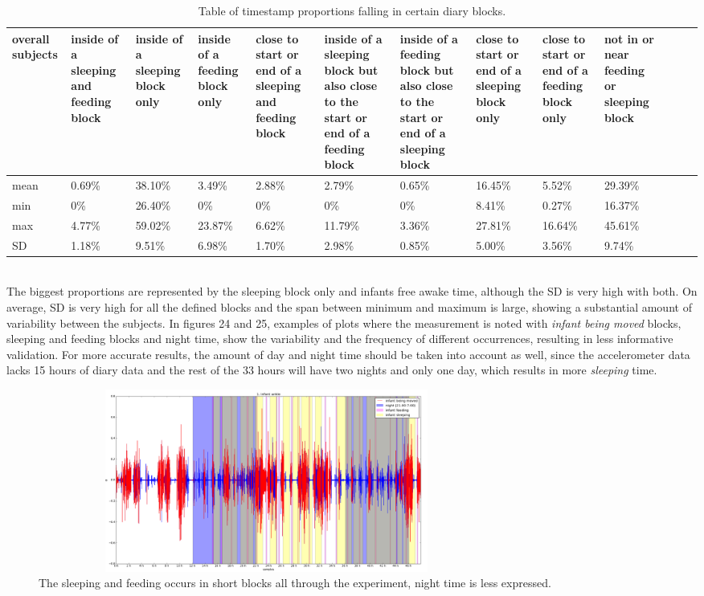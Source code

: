 \documentclass{article}
\begin{document}
{\begin{table}[h]\tiny
\centering
\begin{tabular}{|p{0.5cm}|p{1cm}|p{1cm}|p{1cm}|p{1.5cm}|p{1.5cm}|p{1.5cm}|p{1.2cm}|p{1cm}|p{1cm}|p{1cm}|p{1cm}|p{1cm}|}
\hline
overall subjects & inside of a sleeping and feeding block & inside of a sleeping block only & inside of a feeding block only & close to start or end of a sleeping and feeding block & inside of a sleeping block but also close to the start or end of a feeding block & inside of a feeding block but also close to the start or end of a sleeping block & close to start or end of a sleeping block only & close to start or end of a feeding block only & not in or near feeding or sleeping block \\ \hline
mean & 0.69\% & 38.10\% & 3.49\% & 2.88\% & 2.79\% & 0.65\% & 16.45\% & 5.52\% & 29.39\% \\ \hline
min & 0\% & 26.40\% & 0\% & 0\% & 0\% & 0\% & 8.41\% & 0.27\% & 16.37\% \\ \hline
max & 4.77\% & 59.02\% & 23.87\% & 6.62\% & 11.79\% & 3.36\% & 27.81\% & 16.64\% & 45.61\% \\ \hline
SD & 1.18\% & 9.51\% & 6.98\% & 1.70\% & 2.98\% & 0.85\% & 5.00\% & 3.56\% & 9.74\% \\ \hline
\end{tabular}
\caption{Table of timestamp proportions falling in certain diary blocks. }
\end{table}
\\
The biggest proportions are represented by the sleeping block only and infants free awake time, although the SD is very high with both. On average, SD is very high for all the defined blocks and the span between minimum and maximum is large, showing a substantial amount of variability between the subjects. In figures 24 and 25, examples of plots where the measurement is noted with \textit{infant being moved} blocks, sleeping and feeding blocks and night time, show the variability and the frequency of different occurrences, resulting in less informative validation. For more accurate results, the amount of day and night time should be taken into account as well, since the accelerometer data lacks 15 hours of diary data and the rest of the 33 hours will have two nights and only one day, which results in more \textit{sleeping} time.
\begin{figure}[h]
\includegraphics[width=15cm, height=6cm]{1moved.png}
\caption{The sleeping and feeding occurs in short blocks all through the experiment, night time is less expressed. }
\end{figure}

}
\end{document}
